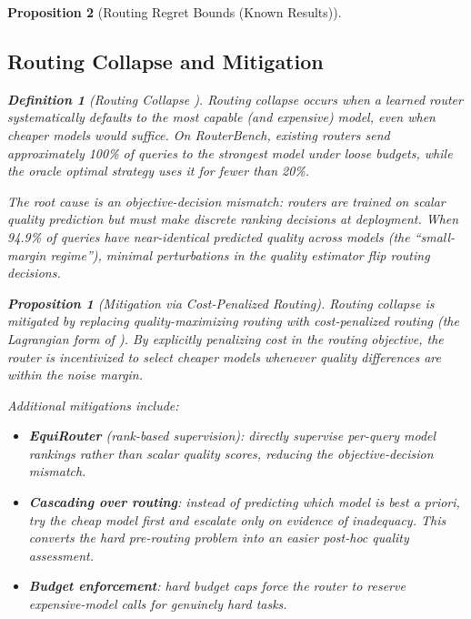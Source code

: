 \documentclass[11pt, a4paper, logo, copyright]{googledeepmind}
\newtheorem{definition}{Definition}[section]
\newtheorem{proposition}{Proposition}[section]
\begin{document}
\begin{proposition}[Routing Regret Bounds (Known Results)]
\subsection{Routing Collapse and Mitigation}

\begin{definition}[Routing Collapse {\citep{routingcollapse2026}}]
\emph{Routing collapse} occurs when a learned router systematically defaults to the most capable (and expensive) model, even when cheaper models would suffice. On RouterBench, existing routers send approximately 100\% of queries to the strongest model under loose budgets, while the oracle optimal strategy uses it for fewer than 20\%.
\end{definition}

The root cause is an \emph{objective-decision mismatch}: routers are trained on scalar quality prediction but must make discrete ranking decisions at deployment. When 94.9\% of queries have near-identical predicted quality across models (the ``small-margin regime''), minimal perturbations in the quality estimator flip routing decisions.

\begin{proposition}[Mitigation via Cost-Penalized Routing]
Routing collapse is mitigated by replacing quality-maximizing routing with cost-penalized routing (the Lagrangian form of ). By explicitly penalizing cost in the routing objective, the router is incentivized to select cheaper models whenever quality differences are within the noise margin.
\end{proposition}

Additional mitigations include:
\begin{itemize}
\item \textbf{EquiRouter} (rank-based supervision): directly supervise per-query model rankings rather than scalar quality scores, reducing the objective-decision mismatch.
\item \textbf{Cascading over routing}: instead of predicting which model is best \emph{a priori}, try the cheap model first and escalate only on evidence of inadequacy. This converts the hard pre-routing problem into an easier post-hoc quality assessment.
\item \textbf{Budget enforcement}: hard budget caps force the router to reserve expensive-model calls for genuinely hard tasks.
\end{itemize}



\end{proposition}
\end{document}
